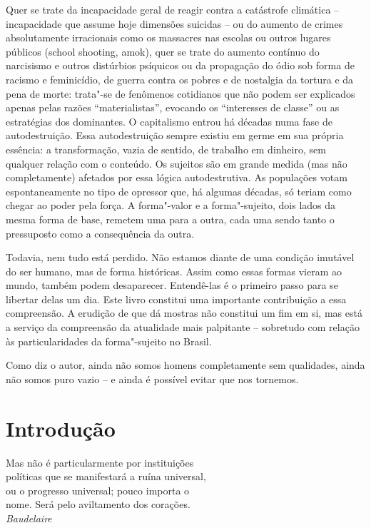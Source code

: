 Quer se trate da incapacidade geral de reagir contra a catástrofe
climática -- incapacidade que assume hoje dimensões suicidas -- ou do
aumento de crimes absolutamente irracionais como os massacres nas
escolas ou outros lugares públicos (school shooting, amok), quer se
trate do aumento contínuo do narcisismo e outros distúrbios psíquicos ou
da propagação do ódio sob forma de racismo e feminicídio, de guerra
contra os pobres e de nostalgia da tortura e da pena de morte: trata"-se
de fenômenos cotidianos que não podem ser explicados apenas pelas razões
``materialistas'', evocando os ``interesses de classe'' ou as
estratégias dos dominantes. O capitalismo entrou há décadas numa fase de
autodestruição. Essa autodestruição sempre existiu em germe em sua
própria essência: a transformação, vazia de sentido, de trabalho em
dinheiro, sem qualquer relação com o conteúdo. Os sujeitos são em grande
medida (mas não completamente) afetados por essa lógica autodestrutiva.
As populações votam espontaneamente no tipo de opressor que, há algumas
décadas, só teriam como chegar ao poder pela força. A forma"-valor e a
forma"-sujeito, dois lados da mesma forma de base, remetem uma para a
outra, cada uma sendo tanto o pressuposto como a consequência da outra.

Todavia, nem tudo está perdido. Não estamos diante de uma condição
imutável do ser humano, mas de forma históricas. Assim como essas formas
vieram ao mundo, também podem desaparecer. Entendê-las é o primeiro
passo para se libertar delas um dia. Este livro constitui uma importante
contribuição a essa compreensão. A erudição de que dá mostras não
constitui um fim em si, mas está a serviço da compreensão da atualidade
mais palpitante -- sobretudo com relação às particularidades da
forma"-sujeito no Brasil.

Como diz o autor, ainda não somos homens completamente sem qualidades,
ainda não somos puro vazio -- e ainda é possível evitar que nos
tornemos.

\chapter*{Introdução}

\begin{flushright}
\scriptsize{Mas não é particularmente por instituições\\
políticas que se manifestará a ruína universal,\\
ou o progresso universal; pouco importa o\\
nome. Será pelo aviltamento dos corações.\\
\emph{Baudelaire}}\\
\end{flushright}

